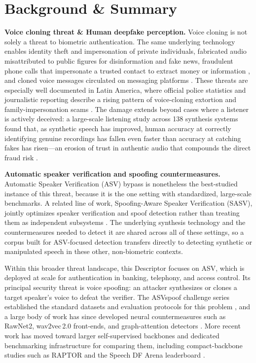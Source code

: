 \documentclass[11pt]{article}
\begin{document}
\section*{Background \& Summary}

\textbf{Voice cloning threat \& Human deepfake perception.} Voice cloning is not solely a threat to biometric authentication. The same underlying technology enables identity theft and impersonation of private individuals, fabricated audio misattributed to public figures for disinformation and fake news, fraudulent phone calls that impersonate a trusted contact to extract money or information \citep{forbes2019ceofraud,destefano2023testimony,europol2022deepfakes}, and cloned voice messages circulated on messaging platforms \citep{infobae2026whatsapp}. These threats are especially well documented in Latin America, where official police statistics and journalistic reporting describe a rising pattern of voice-cloning extortion and family-impersonation scams \citep{infobae2025colombia,infobae2026whatsapp}. The damage extends beyond cases where a listener is actively deceived: a large-scale listening study across 138 synthesis systems found that, as synthetic speech has improved, human accuracy at correctly identifying genuine recordings has fallen even faster than accuracy at catching fakes has risen---an erosion of trust in authentic audio that compounds the direct fraud risk \citep{muller2026erodingtrust}.

\textbf{Automatic speaker verification and spoofing countermeasures.} Automatic Speaker Verification (ASV) bypass is nonetheless the best-studied instance of this threat, because it is the one setting with standardized, large-scale benchmarks. A related line of work, Spoofing-Aware Speaker Verification (SASV), jointly optimizes speaker verification and spoof detection rather than treating them as independent subsystems \citep{sasvevalplan2022,sasv2022}. The underlying synthesis technology and the countermeasures needed to detect it are shared across all of these settings, so a corpus built for ASV-focused detection transfers directly to detecting synthetic or manipulated speech in these other, non-biometric contexts.

Within this broader threat landscape, this Descriptor focuses on ASV, which is deployed at scale for authentication in banking, telephony, and access control. Its principal security threat is voice spoofing: an attacker synthesizes or clones a target speaker's voice to defeat the verifier. The ASVspoof challenge series established the standard datasets and evaluation protocols for this problem \citep{asvspoof2019,asvspoof2021,asvspoof5}, and a large body of work has since developed neural countermeasures such as RawNet2, wav2vec\,2.0 front-ends, and graph-attention detectors \citep{rawnet2,tak2022ssl,aasist}. More recent work has moved toward larger self-supervised backbones and dedicated benchmarking infrastructure for comparing them, including compact-backbone studies such as RAPTOR \citep{raptor2026} and the Speech DF Arena leaderboard \citep{dowerah2025speechdfarena}.
\end{document}
